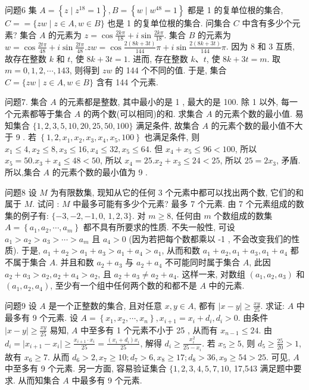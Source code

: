 问题6 集 $A=\left\{z \mid z^{18}=1\right\}, B=\left\{w \mid w^{48}=1\right\}$ 都是 1 的复单位根的集合, $C==\{z w \mid z \in A, w \in B\}$ 也是 1 的复单位根的集合.
问集合 $C$ 中含有多少个元素?
集合 $A$ 的元素为 $z=\cos \frac{2 k \pi}{18}+i \sin \frac{2 k \pi}{18}$. 集合 $B$ 的元素为 $w= \cos \frac{2 t \pi}{48}+i \sin \frac{2 t \pi}{48} . z w=\cos \frac{2(8 k+3 t)}{144} \pi+i \sin \frac{2(8 k+3 t)}{144} \pi$. 因为 8 和 3 互质, 故存在整数 $k$ 和 $t$, 使 $8 k+3 t=1$. 进而, 存在整数 $k 、 t$, 使 $8 k+3 t=m$. 取 $m=0,1,2, \cdots, 143$, 则得到 $z w$ 的 144 个不同的值.
于是, 集合 $C=\{z w \mid z \in A, w \in B\}$ 含有 144 个元素.



问题7. 集合 $A$ 的元素都是整数, 其中最小的是 1 , 最大的是 100. 除 1 以外, 每一个元素都等于集合 $A$ 的两个数(可以相同)的和.
求集合 $A$ 的元素个数的最小值.
易知集合 $\{1,2,3,5,10,20,25,50,100\}$ 满足条件, 故集合 $A$ 的元素个数的最小值不大于 9 . 若 $\left\{1,2, x_1, x_2, x_3, x_4, x_5, 100\right\}$ 也满足条件, 则 $x_1 \leqslant 4, x_2 \leqslant 8, x_3 \leqslant 16, x_4 \leqslant 32, x_5 \leqslant 64$. 但 $x_4+x_5 \leqslant 96<100$, 所以 $x_5=50 . x_3+x_4 \leqslant 48<50$, 所以 $x_4=25 . x_2+x_3 \leqslant 24<25$, 所以 $25=2 x_3$, 矛盾.
所以,集合 $A$ 的元素个数的最小值为 9 .



问题8 设 $M$ 为有限数集, 现知从它的任何 3 个元素中都可以找出两个数, 它们的和属于 $M$. 试问 : $M$ 中最多可能有多少个元素?
最多 7 个元素.
由 7 个元素组成的数集的例子有: $\{-3,-2,-1,0$, $1,2,3\}$. 对 $m \geqslant 8$, 任何由 $m$ 个数组成的数集 $A=\left\{a_1, a_2, \cdots, a_m\right\}$ 都不具有所要求的性质.
不失一般性, 可设 $a_1>a_2>a_3>\cdots>a_m$ 且 $a_4>0$ (因为若把每个数都乘以 -1 , 不会改变我们的性质). 于是, $a_1+a_2>a_1+a_3>a_1+$$a_4>a_1$, 从而和数 $a_1+a_2, a_1+a_3, a_1+a_4$ 都不属于集合 $A$. 并且和数 $a_2+a_3$ 与 $a_2+a_4$ 不可能同时属于集合 $A$, 此因 $a_2+a_3>a_2, a_2+a_4>a_2$, 且 $a_2+ a_3 \neq a_2+a_4$. 这样一来, 对数组 $\left(a_1, a_2, a_3\right)$ 和 $\left(a_1, a_2, a_4\right)$, 至少有一个组中任何两个数的和都不是 $A$ 中的元素.



问题9 设 $A$ 是一个正整数的集合, 且对任意 $x, y \in A$, 都有 $|x-y| \geqslant \frac{x y}{25}$. 求证: $A$ 中最多有 9 个元素.
设 $A=\left\{x_1, x_2, \cdots, x_n\right\}, x_{i+1}=x_i+d_i, d_i>0$. 由条件 $|x-y| \geqslant \frac{x y}{25}$ 易知, $A$ 中至多有 1 个元素不小于 25 , 从而有 $x_{n-1} \leqslant 24$. 由 $d_i=\mid x_{i+1}- x_i \mid \geqslant \frac{x_{i+1} \cdot x_i}{25}=\frac{\left(x_i+d_i\right) x_i}{25}$, 解得 $d_i \geqslant \frac{x_i^2}{25-x_i}$. 若 $x_5 \geqslant 5$, 则 $d_5 \geqslant \frac{25}{20}>1$, 故有 $x_6 \geqslant 7$. 从而 $d_6>2, x_7 \geqslant 10 ; d_7>6, x_8 \geqslant 17 ; d_8>36, x_9 \geqslant 54>25$. 可见, $A$ 中至多有 9 个元素.
另一方面, 容易验证集合 $\{1,2,3,4,5,7,10$, 17,543 满足题中要求.
从而知集合 $A$ 中最多有 9 个元素.



